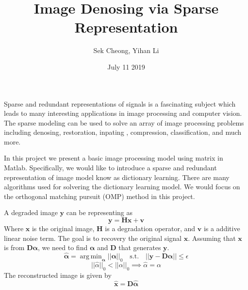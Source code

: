 \documentclass[12pt]{extarticle}
\title{Image Denosing via Sparse Representation}
\author{Sek Cheong, Yihan Li }
\date{July 11 2019}
\DeclareMathOperator*{\argmin}{arg\,min}
\begin{document}
\maketitle
Sparse and redundant representations \cite{Elad2010SparseModeling} of signals is a fascinating subject which leads to many interesting applications in image processing and computer vision. The sparse modeling can be used to solve an array of image processing problems including denosing\cite{EladAharon2006}, restoration, inpating \cite{ShenHu2009}, compression, classification, and much more. 
 

In this project we present a basic image processing model using matrix in Matlab. Specifically, we would like to introduce a sparse and redundant representation of image model know as dictionary learning. There are many algorithms used for solvering the dictionary learning model. We would focus on the orthogonal matching pursuit (OMP) \cite{TroppGilbert2007} method in this project. 

A degraded image $\bm{y}$ can be representing as
 \[ 
 \bm{y}=\bm{Hx}+\bm{v}
 \]
Where $\bm{x}$  is the original image, $\bm{H}$ is a degradation operator, and $\bm{v}$ is a additive linear noise term. The goal is to recovery the original signal $\bm{x}$. Assuming that $\bm{x}$ is from $\bm{D\alpha}$, we need to find $\bm{\alpha}$ and $\bm{D}$ that generates $\bm{y}$. 
\[
    \hat{\bm{\alpha}} = \argmin_{\bm{\alpha}}||\bm{\alpha}||_0 \quad
    \textrm{s.t.} \quad
    ||\bm{y}-\bm{D}\bm{\alpha}||\le \epsilon
\]
\[
    ||\hat{\alpha}||_0<||\alpha||_0 \implies \hat{\alpha} = \alpha
\]
The reconstructed image is given by
\[
    \hat{\bm{x}} = \bm{D}\hat{\bm{\alpha}} 
\]





\end{document}

